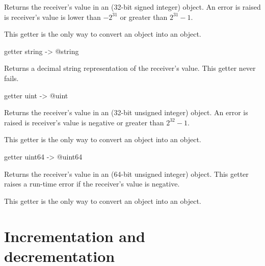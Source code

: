 Returns the receiver's value in an  (32-bit signed integer) object. An error is raised is receiver's value is lower than $-2^{31}$ or greater than $2^{31}-1$.

This getter is the only way to convert an  object into an  object.






\begin{galgascode}
getter string -> @string
\end{galgascode}

Returns a decimal string representation of the receiver's value. This getter never fails.









\begin{galgascode}
getter uint -> @uint
\end{galgascode}

Returns the receiver's value in an  (32-bit unsigned integer) object. An error is raised is receiver's value is negative or greater than $2^{32}-1$.

This getter is the only way to convert an  object into an  object.






\begin{galgascode}
getter uint64 -> @uint64
\end{galgascode}

Returns the receiver's value in an  (64-bit unsigned integer) object. This getter raises a run-time error if the receiver's value is negative.

This getter is the only way to convert an  object into an  object.







\section{Incrementation and decrementation}

